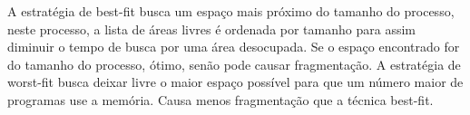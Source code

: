 
A estratégia de best-fit busca um espaço mais próximo do tamanho do processo, neste
processo, a lista de áreas livres é ordenada por tamanho para assim diminuir o tempo
de busca por uma área desocupada.
Se o espaço encontrado for do tamanho do processo, ótimo, senão pode causar fragmentação.
A estratégia de worst-fit busca deixar livre o maior espaço possível para que um
número maior de programas use a memória. Causa menos fragmentação que a técnica
best-fit. \\
